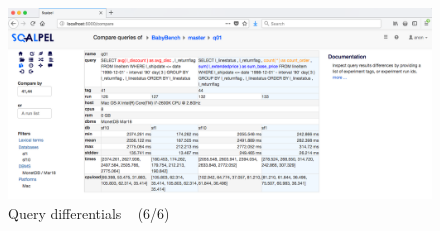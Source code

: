 \documentclass{cidr-2019}
\begin{document}
\begin{figure}[t!]
\centering
\includegraphics[width=\textwidth]{Figures/compare2.png}
\caption{Query differentials ~ \textsf{(6/6)}
	\label{fig:differential}}
\end{figure}












\end{document}
